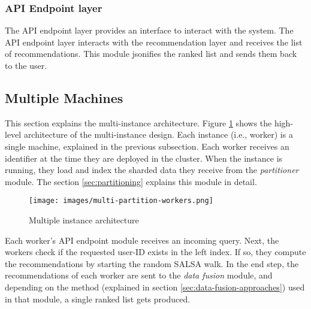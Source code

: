 \subsubsection{API Endpoint layer}
\label{subsubsec:api-endpoint-layer}
The API endpoint layer provides an interface to interact with the system. The API endpoint layer interacts with the recommendation layer and receives the list of recommendations. This module jsonifies the ranked list and sends them back to the user. 

\subsection{Multiple Machines}
\label{Multiple Machines}
This section explains the multi-instance architecture. Figure \ref{fig:multiple-machine-architecture} shows the high-level architecture of the multi-instance design. Each instance (i.e., worker) is a single machine, explained in the previous subsection. Each worker receives an identifier at the time they are deployed in the cluster. When the instance is running, they load and index the sharded data they receive from the \emph{partitioner} module. The section \ref{sec:partitioning} explains this module in detail. 



\begin{figure}[!h]
	\centering
	\texttt{[image: images/multi-partition-workers.png]}
	\caption{Multiple instance architecture}
	\label{fig:multiple-machine-architecture}
\end{figure}


Each worker's API endpoint module receives an incoming query. Next, the workers check if the requested user-ID exists in the left index. If so, they compute the recommendations by starting the random SALSA walk. In the end step, the recommendations of each worker are sent to the \emph{data fusion} module, and depending on the method (explained in section \ref{sec:data-fusion-approaches}) used in that module, a single ranked list gets produced.

